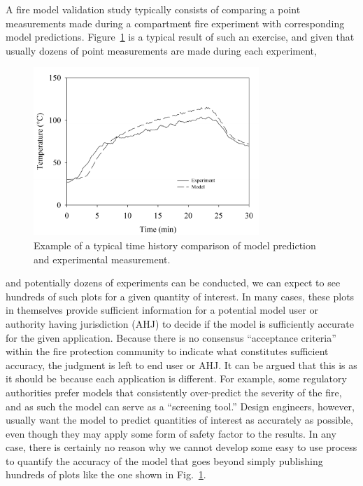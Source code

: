 A fire model validation study typically consists of comparing a point measurements made during a compartment fire experiment with corresponding model predictions.
Figure~\ref{temp_history} is a typical result of such an exercise, and given that usually dozens of point measurements are made during each experiment,
\begin{figure}[ht]
\begin{center}
\includegraphics[height=2.5in]{FIGURES/sample_time_history}
\end{center}
\caption[Sample time history plots.]{Example of a typical time history comparison of model prediction and experimental measurement.}
\label{temp_history}
\end{figure}
and potentially dozens of experiments can be conducted, we can expect to see hundreds of such plots for a given quantity of interest. In many cases, these
plots in themselves provide sufficient information for a potential model user or authority having jurisdiction (AHJ) to decide if the model is sufficiently accurate for the
given application. Because there is no consensus ``acceptance criteria'' within the fire protection community to indicate what constitutes sufficient accuracy, the
judgment is left to end user or AHJ. It can be argued that this is as it should be because each application is different. For example, some regulatory
authorities prefer models that consistently over-predict the severity of the fire, and as such the model can serve as a ``screening tool.'' Design engineers, however,
usually want the model to predict quantities of interest as accurately as possible, even though they may apply some form of safety factor to the results.
In any case, there is certainly no reason why we cannot develop some easy to use process to quantify the accuracy of the model that goes beyond simply
publishing hundreds of plots like the one shown in Fig.~\ref{temp_history}.

